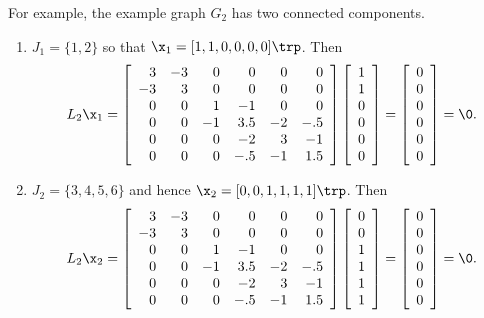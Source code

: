 For example, the example graph $G_2$ has two connected components.
\begin{enumerate}
\item $J_1 = \{1,2\}$ so that $\x_1 = [1, 1, 0, 0, 0, 0]\trp$.
Then
\[
L_2\x_1 =
\left[\begin{array}{rrrrrr}
3 & -3 & 0 & 0 & 0 & 0\\
-3 & 3 & 0 & 0 & 0 & 0\\
0 & 0 & 1 & -1 & 0 & 0\\
0 & 0 & -1 & 3.5 & -2 & -.5\\
0 & 0 & 0 & -2 & 3 & -1\\
0 & 0 & 0 &- .5 & -1 & 1.5
\end{array}\right]
\left[\begin{array}{c}
1 \\ 1 \\ 0 \\ 0 \\ 0 \\ 0
\end{array}\right]
=
\left[\begin{array}{c}
0 \\ 0 \\ 0 \\ 0 \\ 0 \\ 0
\end{array}\right]
= \0.
\]

\item $J_2 = \{3,4,5,6\}$ and hence $\x_2 = [0, 0, 1, 1, 1, 1]\trp$.
Then
\[
L_2\x_2 =
\left[\begin{array}{rrrrrr}
3 & -3 & 0 & 0 & 0 & 0\\
-3 & 3 & 0 & 0 & 0 & 0\\
0 & 0 & 1 & -1 & 0 & 0\\
0 & 0 & -1 & 3.5 & -2 & -.5\\
0 & 0 & 0 & -2 & 3 & -1\\
0 & 0 & 0 &- .5 & -1 & 1.5
\end{array}\right]
\left[\begin{array}{c}
0 \\ 0 \\ 1 \\ 1 \\ 1 \\ 1
\end{array}\right]
=
\left[\begin{array}{c}
0 \\ 0 \\ 0 \\ 0 \\ 0 \\ 0
\end{array}\right]
= \0.
\]
\end{enumerate}


